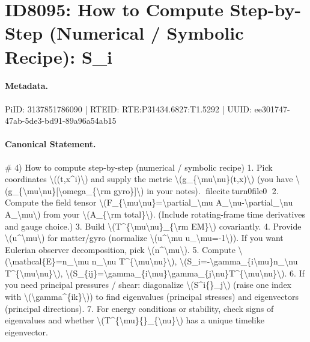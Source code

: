 \section*{ID8095: How to Compute Step-by-Step (Numerical / Symbolic Recipe): S\_i}
\paragraph{Metadata.}
PiID: 3137851786090 | RTEID: RTE:P31434.6827:T1.5292 | UUID: ee301747-47ab-5de3-bd91-89a96a54ab15

\paragraph{Canonical Statement.}
\# 4) How to compute step-by-step (numerical / symbolic recipe) 1. Pick coordinates \textbackslash{}((t,x\textasciicircum{}i)\textbackslash{}) and supply the metric \textbackslash{}(g\_\{\textbackslash{}mu\textbackslash{}nu\}(t,x)\textbackslash{}) (you have \textbackslash{}(g\_\{\textbackslash{}mu\textbackslash{}nu\}[\textbackslash{}omega\_\{\textbackslash{}rm gyro\}]\textbackslash{}) in your notes). fileciteturn0file0 2. Compute the field tensor \textbackslash{}(F\_\{\textbackslash{}mu\textbackslash{}nu\}=\textbackslash{}partial\_\textbackslash{}mu A\_\textbackslash{}nu-\textbackslash{}partial\_\textbackslash{}nu A\_\textbackslash{}mu\textbackslash{}) from your \textbackslash{}(A\_\{\textbackslash{}rm total\}\textbackslash{}). (Include rotating-frame time derivatives and gauge choice.) 3. Build \textbackslash{}(T\textasciicircum{}\{\textbackslash{}mu\textbackslash{}nu\}\_\{\textbackslash{}rm EM\}\textbackslash{}) covariantly. 4. Provide \textbackslash{}(u\textasciicircum{}\textbackslash{}mu\textbackslash{}) for matter/gyro (normalize \textbackslash{}(u\textasciicircum{}\textbackslash{}mu u\_\textbackslash{}mu=-1\textbackslash{})). If you want Eulerian observer decomposition, pick \textbackslash{}(n\textasciicircum{}\textbackslash{}mu\textbackslash{}). 5. Compute \textbackslash{}(\textbackslash{}mathcal\{E\}=n\_\textbackslash{}mu n\_\textbackslash{}nu T\textasciicircum{}\{\textbackslash{}mu\textbackslash{}nu\}\textbackslash{}), \textbackslash{}(S\_i=-\textbackslash{}gamma\_\{i\textbackslash{}mu\}n\_\textbackslash{}nu T\textasciicircum{}\{\textbackslash{}mu\textbackslash{}nu\}\textbackslash{}), \textbackslash{}(S\_\{ij\}=\textbackslash{}gamma\_\{i\textbackslash{}mu\}\textbackslash{}gamma\_\{j\textbackslash{}nu\}T\textasciicircum{}\{\textbackslash{}mu\textbackslash{}nu\}\textbackslash{}). 6. If you need principal pressures / shear: diagonalize \textbackslash{}(S\textasciicircum{}i\{\}\_j\textbackslash{}) (raise one index with \textbackslash{}(\textbackslash{}gamma\textasciicircum{}\{ik\}\textbackslash{})) to find eigenvalues (principal stresses) and eigenvectors (principal directions). 7. For energy conditions or stability, check signs of eigenvalues and whether \textbackslash{}(T\textasciicircum{}\{\textbackslash{}mu\}\{\}\_\{\textbackslash{}nu\}\textbackslash{}) has a unique timelike eigenvector.

